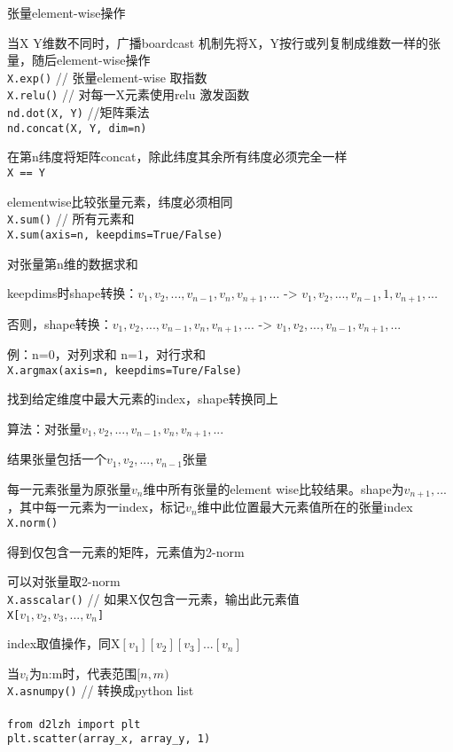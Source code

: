\documentclass[UTF8]{ctexart}
\begin{document}
  张量element-wise操作
  
  当X Y维数不同时，广播boardcast 机制先将X，Y按行或列复制成维数一样的张量，随后element-wise操作\\
\texttt{X.exp()} // 张量element-wise 取指数\\
\texttt{X.relu()} // 对每一X元素使用relu 激发函数\\
\texttt{nd.dot(X, Y)} //矩阵乘法\\
\texttt{nd.concat(X, Y, dim=n)}

  在第n纬度将矩阵concat，除此纬度其余所有纬度必须完全一样\\
\texttt{X == Y} 

  elementwise比较张量元素，纬度必须相同\\
\texttt{X.sum()} // 所有元素和\\
\texttt{X.sum(axis=n, keepdims=True/False)}

  对张量第n维的数据求和
  
  keepdims时shape转换：$v_1, v_2, ..., v_{n-1}, v_n, v_{n+1}, ...$ -> $v_1, v_2, ..., v_{n-1}, 1, v_{n+1}, ...$

  否则，shape转换：$v_1, v_2, ..., v_{n-1}, v_n, v_{n+1}, ...$ -> $v_1, v_2, ..., v_{n-1}, v_{n+1}, ...$

  例：n=0，对列求和 n=1，对行求和\\
\texttt{X.argmax(axis=n, keepdims=Ture/False)}
  
  找到给定维度中最大元素的index，shape转换同上

  算法：对张量$v_1, v_2, ..., v_{n-1}, v_n, v_{n+1}, ...$

  \quad 结果张量包括一个$v_1, v_2, ..., v_{n-1}$张量

  \quad 每一元素张量为原张量$v_n$维中所有张量的element wise比较结果。shape为$v_{n+1}, ...$，其中每一元素为一index，标记$v_n$维中此位置最大元素值所在的张量index\\
\texttt{X.norm()}
 
  得到仅包含一元素的矩阵，元素值为2-norm

  可以对张量取2-norm\\
\texttt{X.asscalar()} // 如果X仅包含一元素，输出此元素值\\
\texttt{X[$v_1, v_2, v_3, ..., v_n$]}

  index取值操作，同X$[v_1][v_2][v_3]...[v_n]$

  当$v_i$为n:m时，代表范围$[n, m)$\\
\texttt{X.asnumpy()} // 转换成python list\\\\
\texttt{from d2lzh import plt}\\
\texttt{plt.scatter(array\_x, array\_y, 1)}
\end{document}
